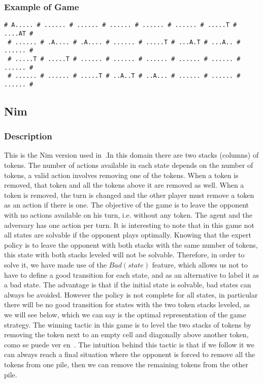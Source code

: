 \documentclass[a4paper]{article}
\begin{document}
\subsubsection{Example of Game}
\begin{Verbatim}[fontsize=\footnotesize]
 # A..... # ...... # ...... # ...... # ...... # ...... # .....T # ....AT #
 # ...... # .A.... # .A.... # ...... # .....T # ...A.T # ...A.. # ...... #
 # .....T # .....T # ...... # ...... # ...... # ...... # ...... # ...... #
 # ...... # ...... # .....T # ..A..T # ..A... # ...... # ...... # ...... #
\end{Verbatim}

\subsection{Nim}
\subsubsection{Description}
This is the Nim version used in~\cite{silver2020few}.In this domain there are two stacks (columns) of tokens. The number of actions available in each state depends on the number of tokens, a valid action involves removing one of the tokens. When a token is removed, that token and all the tokens above it are removed as well. When a token is removed, the turn is changed and the other player must remove a token as an action if there is one. The objective of the game is to leave the opponent with no actions available on his turn, i.e. without any token. The agent and the adversary has one action per turn.
It is interesting to note that in this game not all states are solvable if the opponent plays optimally. Knowing that the expert policy is to leave the opponent with both stacks with the same number of tokens, this state with both stacks leveled will not be solvable. Therefore, in order to solve it, we have made use of the $Bad(state)$ feature, which allows us not to have to define a good transition for each state, and as an alternative to label it as a bad state. The advantage is that if the initial state is solvable, bad states can always be avoided. However the policy is not complete for all states, in particular there will be no good transition for states with the two token stacks leveled, as we will see below, which we can say is the optimal representation of the game strategy. The winning tactic in this game is to level the two stacks of tokens by removing the token next to an empty cell and diagonally above another token, como se puede ver en~\cite{silver2020few}. The intuition behind this tactic is that if we follow it we can always reach a final situation where the opponent is forced to remove all the tokens from one pile, then we can remove the remaining tokens from the other pile.
\end{document}
